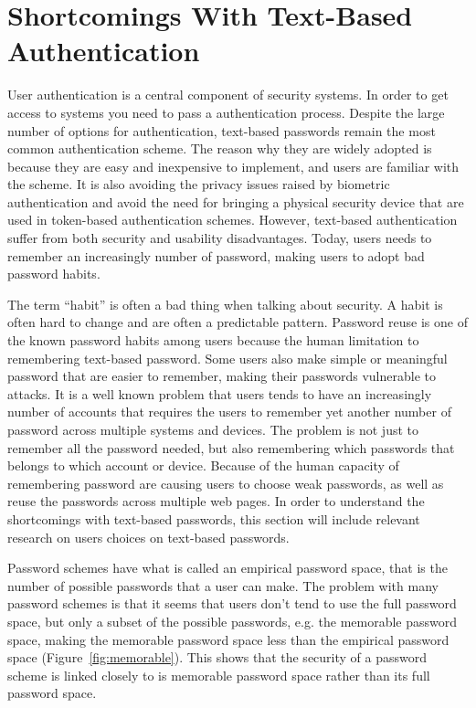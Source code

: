   \section{Shortcomings With Text-Based Authentication} \label{sec:shortcomings}

  User authentication is a central component of security systems. In order to get access to systems you need to pass a authentication process. Despite the large number of options for authentication, text-based passwords remain the most common authentication scheme. The reason why they are widely adopted is because they are easy and inexpensive to implement, and users are familiar with the scheme. It is also avoiding the privacy issues raised by biometric authentication and avoid the need for bringing a physical security device that are used in token-based authentication schemes. However, text-based authentication suffer from both security and usability disadvantages. Today, users needs to remember an increasingly number of password, making users to adopt bad password habits. 

  The term ``habit'' is often a bad thing when talking about security. A habit is often hard to change and are often a predictable pattern. Password reuse is one of the known password habits among users because the human limitation to remembering text-based password. Some users also make simple or meaningful password that are easier to remember, making their passwords vulnerable to attacks. It is a well known problem that users tends to have an increasingly number of accounts that requires the users to remember yet another number of password across multiple systems and devices. The problem is not just to remember all the password needed, but also remembering which passwords that belongs to which account or device. Because of the human capacity of remembering password are causing users to choose weak passwords, as well as reuse the passwords across multiple web pages. In order to understand the shortcomings with text-based passwords, this section will include relevant research on users choices on text-based passwords.  

  Password schemes have what is called an empirical password space, that is the number of possible passwords that a user can make. The problem with many password schemes is that it seems that users don't tend to use the full password space, but only a subset of the possible passwords, e.g. the memorable password space, making the memorable password space less than the empirical password space (Figure~\ref{fig:memorable}). This shows that the security of a password scheme is linked closely to is memorable password space rather than its full password space.

